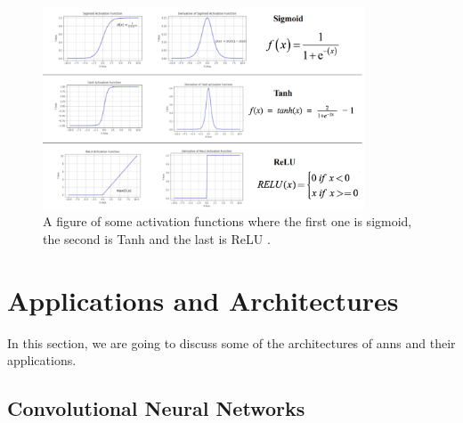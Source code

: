 \documentclass[runningheads]{llncs}
\begin{document}
\begin{figure}[H]
    \label{actfig}
    \centering
    \includegraphics[height=6cm]{actfig}
    \caption{A figure of some activation functions where the first one is sigmoid, the second is Tanh and the last is ReLU \cite{sdc}.}
\end{figure}



\section{Applications and Architectures}

In this section, we are going to discuss some of the architectures of \gls{anns}
and their applications.

\subsection{Convolutional Neural Networks}
\end{document}
